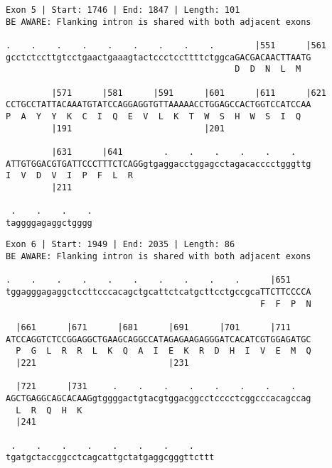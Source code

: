 \documentclass{article}
\begin{document}
\newpage
\begin{Verbatim}[fontfamily=courier]
Exon 5 | Start: 1746 | End: 1847 | Length: 101
BE AWARE: Flanking intron is shared with both adjacent exons

.    .    .    .    .    .    .    .    .        |551      |561
gcctctccttgtcctgaactgaaagtactccctccttttctggcaGACGACAACTTAATG
                                             D  D  N  L  M  

         |571      |581      |591      |601      |611      |621
CCTGCCTATTACAAATGTATCCAGGAGGTGTTAAAAACCTGGAGCCACTGGTCCATCCAA
P  A  Y  Y  K  C  I  Q  E  V  L  K  T  W  S  H  W  S  I  Q  
         |191                          |201                 

         |631      |641        .    .    .    .    .    .   
ATTGTGGACGTGATTCCCTTTCTCAGGgtgaggacctggagcctagacacccctgggttg
I  V  D  V  I  P  F  L  R                                   
         |211                                               

 .    .    .    .
taggggagaggctgggg
\end{Verbatim}
\newpage
\begin{Verbatim}[fontfamily=courier]
Exon 6 | Start: 1949 | End: 2035 | Length: 86
BE AWARE: Flanking intron is shared with both adjacent exons

.    .    .    .    .    .    .    .    .    .      |651    
tggagggagaggctccttcccacagctgcattctcatgcttcctgccgcaTTCTTCCCCA
                                                  F  F  P  N

  |661      |671      |681      |691      |701      |711    
ATCCAGGTCTCCGGAGGCTGAAGCAGGCCATAGAGAAGAGGGATCACATCGTGGAGATGC
  P  G  L  R  R  L  K  Q  A  I  E  K  R  D  H  I  V  E  M  Q
  |221                          |231                        

  |721      |731     .    .    .    .    .    .    .    .   
AGCTGAGGCAGCACAAGgtggggactgtacgtggacggcctcccctcggcccacagccag
  L  R  Q  H  K                                             
  |241                                                      

 .    .    .    .    .    .    .    .    
tgatgctaccggcctcagcattgctatgaggcgggttcttt
\end{Verbatim}
\newpage
\end{document}

